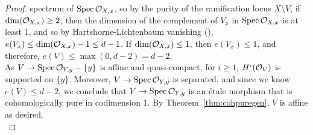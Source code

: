 \begin{proof}
spectrum of $\spec{\cal{O}_{X,x}}$, so by the purity of the ramification locus $X \setminus V$, if
$\mathrm{dim}(\cal{O}_{X,x}) \ge 2$, then 
the dimension of the complement of $V_x$ in $\spec{\cal{O}_{X,x}}$ is at least $1$, and so by Hartshorne-Lichtenbaum vanishing (\cite[0EB7]{sp}), 
$e(V_x) \le \mathrm{dim}(\cal{O}_{X,x})-1 \le d-1$. If $\mathrm{dim}(\cal{O}_{X,x}) \le 1$, then $e(V_x) \le 1$, and therefore, $e(V) \le \max(0,d-2)=d-2$.\\
\indent As $V \to \spec{\cal{O}_{Y,y}} - \{y\}$ is affine and quasi-compact, for $i \ge 1$, $H^i(\cal{O}_V)$ is supported on $\{y\}$. Moreover, $V \to \spec{\cal{O}_{Y,y}}$ 
is separated, and since we know $e(V) \le d-2$, we conclude that $V \to \spec{\cal{O}_{Y,y}}$ is an \'{e}tale morphism that is cohomologically pure in codimension $1$.
By Theorem~\ref{thm:cohpuregen}, $V$ is affine as desired.\\
\end{proof}

